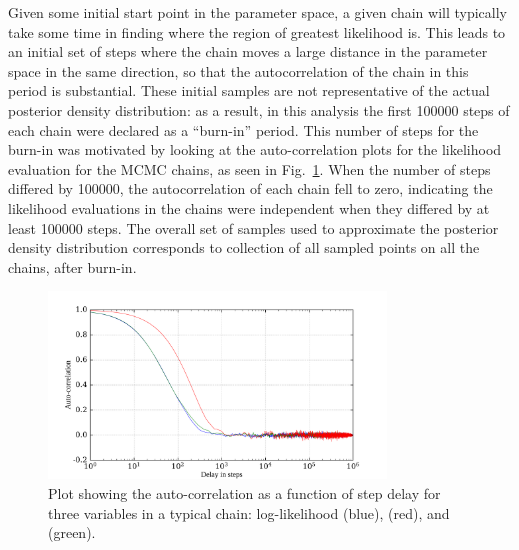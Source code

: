 Given some initial start point in the parameter space, a given chain will typically take some time in finding where the region of greatest likelihood is. This leads to an initial set of steps where the chain moves a large distance in the parameter space in the same direction, so that the autocorrelation of the chain in this period is substantial. These initial samples are not representative of the actual posterior density distribution: as a result, in this analysis the first \num{100000} steps of each chain were declared as a ``burn-in'' period. This number of steps for the burn-in was motivated by looking at the auto-correlation plots for the likelihood evaluation for the MCMC chains, as seen in Fig.~\ref{fig:auto_corr}. When the number of steps differed by \num{100000}, the autocorrelation of each chain fell to zero, indicating the likelihood evaluations in the chains were independent when they differed by at least \num{100000} steps. The overall set of samples used to approximate the posterior density distribution corresponds to collection of all sampled points on all the chains, after burn-in.

\begin{figure}
    \centering
    \includegraphics[width=0.8\textwidth]{6_SolarAnalysis/images/autocorr_plot_llh_dmsq_theta12.pdf}
    \caption[Plot showing the auto-correlation as a function of step delay for three variables in a typical chain]
    {Plot showing the auto-correlation as a function of step delay for three variables in a typical chain: log-likelihood (blue), \dmsq{} (red), and \tonetwo{} (green).}
    \label{fig:auto_corr}
\end{figure}


